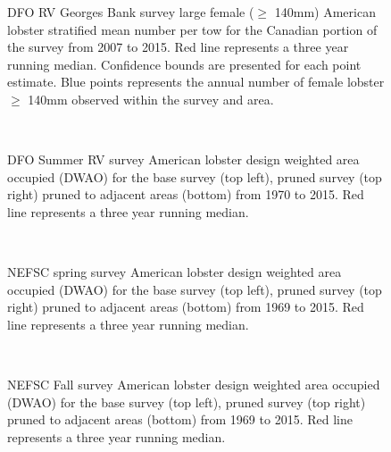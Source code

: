 \documentclass[11pt]{article}
\newcommand{\e}{/backup/bio_data/bio.lobster/figures/} %
\begin{document}
\begin{figure}

    \caption{DFO RV Georges Bank survey large female ($\geq$ 140mm) American lobster stratified mean number per tow for the Canadian portion of the survey from 2007 to 2015. Red line represents a three year running median. Confidence bounds are presented for each point estimate. Blue points represents the annual number of female lobster $\geq$ 140mm observed within the survey and area.}

\end{figure}


\begin{figure}
\centering
{}\\
\caption{DFO Summer RV survey American lobster design weighted area occupied (DWAO) for the base survey (top left), pruned survey (top right) pruned to adjacent areas (bottom) from 1970 to 2015. Red line represents a three year running median.}
\end{figure}
\clearpage


\begin{figure}
\centering
{}\\
\caption{NEFSC spring survey American lobster design weighted area occupied (DWAO) for the base survey (top left), pruned survey (top right) pruned to adjacent areas (bottom) from 1969 to 2015. Red line represents a three year running median. }
\end{figure}
\clearpage


\begin{figure}
\centering
{}\\
\caption{NEFSC Fall survey American lobster design weighted area occupied (DWAO) for the base survey (top left), pruned survey (top right) pruned to adjacent areas (bottom) from 1969 to 2015. Red line represents a three year running median. }
\end{figure}
\clearpage
\end{document}
